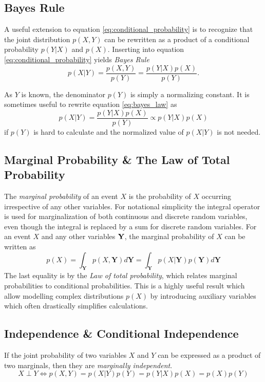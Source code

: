\subsection{Bayes Rule}

A useful extension to equation \eqref{eq:conditional_probability} is to recognize that the joint distribution $p(X, Y)$ can be rewritten as a product of a conditional probability $p(Y | X)$ and $p(X)$. Inserting into equation \eqref{eq:conditional_probability} yields \textit{Bayes Rule}
\begin{equation}\label{eq:bayes_law}
    p(X | Y) = \frac{p(X, Y)}{p(Y)} = \frac{p(Y | X)p(X)}{p(Y)}.
\end{equation}

As $Y$ is known, the denominator $p(Y)$ is simply a normalizing constant. It is sometimes useful to rewrite equation \eqref{eq:bayes_law} as
\begin{equation}\label{eq:bayes_law_proportional}
    p(X | Y) = \frac{p(Y | X) p(X)}{p(Y)} \propto p(Y | X)p(X)
\end{equation} 
if $p(Y)$ is hard to calculate and the normalized value of $p(X | Y)$ is not needed.

\subsection{Marginal Probability \& The Law of Total Probability}\label{sec:marginal_prob}
The \textit{marginal probability} of an event $X$ is the probability of $X$ occurring irrespective of any other variables.
For notational simplicity the integral operator is used for marginalization of both continuous and discrete random variables, even though the integral is replaced by a sum for discrete random variables. For an event $X$ and any other variables $\bf Y$, the marginal probability of $X$ can be written as
\begin{equation}
    p(X) = \int_{\boldsymbol{Y}} p(X, \boldsymbol{Y}) d\boldsymbol{Y} = \int_{\boldsymbol{Y}} p(X | \boldsymbol{Y}) p(\boldsymbol{Y}) d\boldsymbol{Y}
\end{equation}
The last equality is by the \textit{Law of total probability}, which relates marginal probabilities to conditional probabilities. This is a highly useful result which allow modelling complex distributions $p(X)$ by introducing auxiliary variables which often drastically simplifies calculations.

\subsection{Independence \& Conditional Independence}
If the joint probability of two variables $X$ and $Y$ can be expressed as a product of two marginals, then they are \textit{marginally independent}.
\begin{equation}
    X \perp Y \iff p(X, Y) = p(X | Y)p(Y) = p(Y | X)p(X) = p(X)p(Y)
\end{equation}

